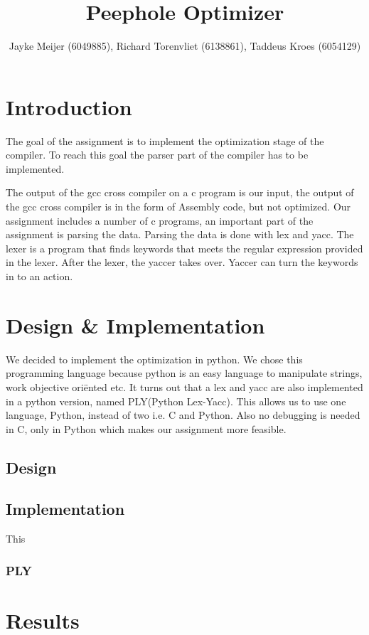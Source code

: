 \documentclass[10pt,a4paper]{article}
\title{Peephole Optimizer}
\author{Jayke Meijer (6049885), Richard Torenvliet (6138861), Taddeus Kroes
    (6054129)}
\begin{document}
\maketitle

\section{Introduction}
The goal of the assignment is to implement the optimization stage of the
compiler. To reach this goal the parser part of the compiler has to be
implemented.

The output of the gcc cross compiler on a c program is our input, the output of
the gcc cross compiler is in the form of Assembly code, but not optimized. Our
assignment includes a number of c programs, an important part of the assignment
is parsing the data. Parsing the data is done with lex and yacc. The lexer is a
program that finds keywords that meets the regular expression provided in the
lexer. After the lexer, the yaccer takes over. Yaccer can turn the keywords in
to an action.

\section{Design \& Implementation}
We decided to implement the optimization in python. We chose this programming
language because python is an easy language to manipulate strings, work
objective ori\"ented etc.
It turns out that a lex and yacc are also implemented in a python version,
named PLY(Python Lex-Yacc). This allows us to use one language, Python, instead
of two i.e. C and Python. Also no debugging is needed in C, only in Python
which makes our assignment more feasible.

\subsection{Design}


\subsection*{Implementation}
This 

\subsubsection*{PLY}

\section{Results}
\end{document}
